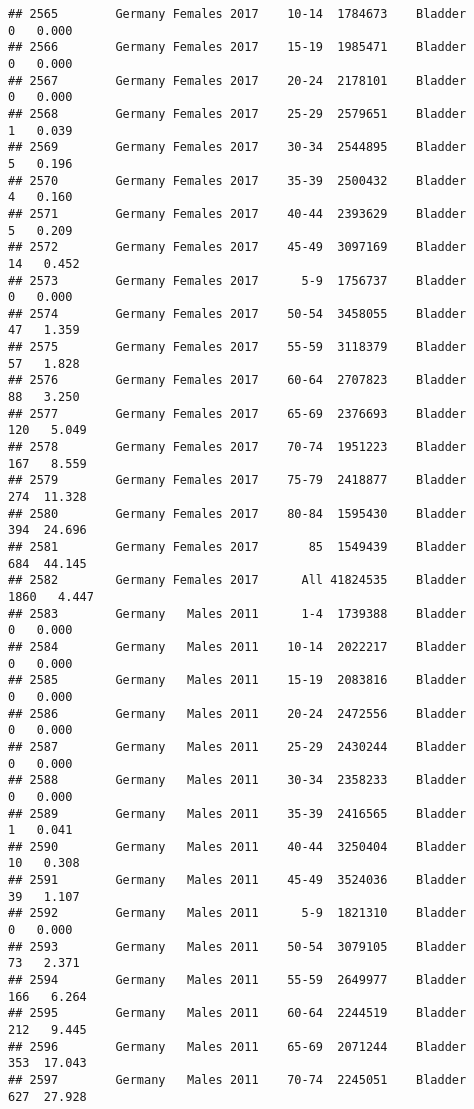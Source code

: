 \documentclass[
]{article}
\begin{document}
\begin{verbatim}
## 2565        Germany Females 2017    10-14  1784673    Bladder      0   0.000
## 2566        Germany Females 2017    15-19  1985471    Bladder      0   0.000
## 2567        Germany Females 2017    20-24  2178101    Bladder      0   0.000
## 2568        Germany Females 2017    25-29  2579651    Bladder      1   0.039
## 2569        Germany Females 2017    30-34  2544895    Bladder      5   0.196
## 2570        Germany Females 2017    35-39  2500432    Bladder      4   0.160
## 2571        Germany Females 2017    40-44  2393629    Bladder      5   0.209
## 2572        Germany Females 2017    45-49  3097169    Bladder     14   0.452
## 2573        Germany Females 2017      5-9  1756737    Bladder      0   0.000
## 2574        Germany Females 2017    50-54  3458055    Bladder     47   1.359
## 2575        Germany Females 2017    55-59  3118379    Bladder     57   1.828
## 2576        Germany Females 2017    60-64  2707823    Bladder     88   3.250
## 2577        Germany Females 2017    65-69  2376693    Bladder    120   5.049
## 2578        Germany Females 2017    70-74  1951223    Bladder    167   8.559
## 2579        Germany Females 2017    75-79  2418877    Bladder    274  11.328
## 2580        Germany Females 2017    80-84  1595430    Bladder    394  24.696
## 2581        Germany Females 2017       85  1549439    Bladder    684  44.145
## 2582        Germany Females 2017      All 41824535    Bladder   1860   4.447
## 2583        Germany   Males 2011      1-4  1739388    Bladder      0   0.000
## 2584        Germany   Males 2011    10-14  2022217    Bladder      0   0.000
## 2585        Germany   Males 2011    15-19  2083816    Bladder      0   0.000
## 2586        Germany   Males 2011    20-24  2472556    Bladder      0   0.000
## 2587        Germany   Males 2011    25-29  2430244    Bladder      0   0.000
## 2588        Germany   Males 2011    30-34  2358233    Bladder      0   0.000
## 2589        Germany   Males 2011    35-39  2416565    Bladder      1   0.041
## 2590        Germany   Males 2011    40-44  3250404    Bladder     10   0.308
## 2591        Germany   Males 2011    45-49  3524036    Bladder     39   1.107
## 2592        Germany   Males 2011      5-9  1821310    Bladder      0   0.000
## 2593        Germany   Males 2011    50-54  3079105    Bladder     73   2.371
## 2594        Germany   Males 2011    55-59  2649977    Bladder    166   6.264
## 2595        Germany   Males 2011    60-64  2244519    Bladder    212   9.445
## 2596        Germany   Males 2011    65-69  2071244    Bladder    353  17.043
## 2597        Germany   Males 2011    70-74  2245051    Bladder    627  27.928

\end{verbatim}
\end{document}
